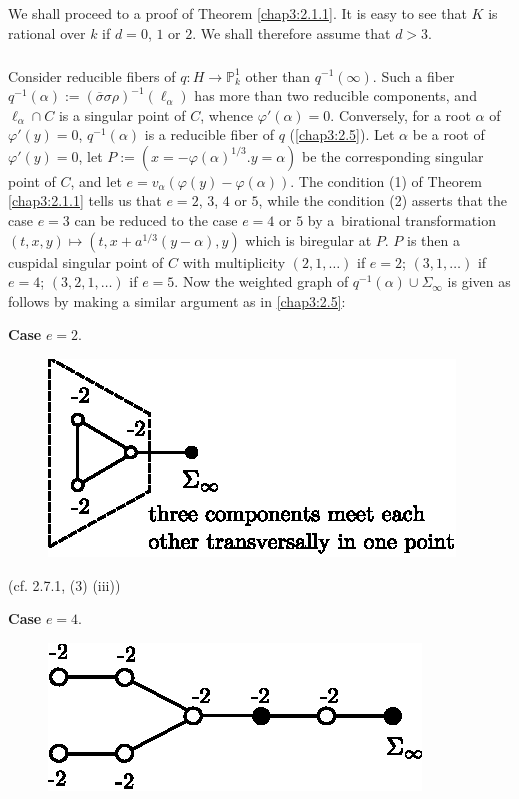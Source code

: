 \subsection{}\label{chap3:2.8}
We shall proceed to a proof of Theorem \ref{chap3:2.1.1}. It is easy to
see that $K$ is rational over $k$ if $d=0$, $1$ or $2$. We shall
therefore assume that $d>3$.

\subsubsection{}\label{chap3:2.8.1}
Consider reducible fibers of $q:H\to \mathbb{P}^{1}_{k}$ other than
$q^{-1}(\infty)$. Such a fiber
$q^{-1}(\alpha):=(\overline{\sigma}\sigma\rho)^{-1}(\ell_{\alpha})$
has more than two reducible components, and $\ell_{\alpha}\cap C$ is a
singular point of $C$, whence $\varphi'(\alpha)=0$. Conversely, for a
root $\alpha$ of $\varphi'(y)=0$, $q^{-1}(\alpha)$ is a reducible
fiber of $q$ (\cf \ref{chap3:2.5}). Let $\alpha$ be a root of
$\varphi'(y)=0$, let $P:=(x=-\varphi(\alpha)^{1/3}.y=\alpha)$ be the
corresponding singular point of $C$, and let
$e=v_{\alpha}(\varphi(y)-\varphi(\alpha))$. The condition (1) of
Theorem \ref{chap3:2.1.1} tells us that $e=2$, $3$, $4$ or $5$, while the
condition (2) asserts that the case $e=3$ can be reduced to the case
$e=4$ or $5$ by a\pageoriginale\ birational transformation
$(t,x,y)\mapsto (t,x+a^{1/3}(y-\alpha),y)$ which is biregular at
$P$. $P$ is then a cuspidal singular point of $C$ with multiplicity
$(2,1,\ldots)$ if $e=2$; $(3,1,\ldots)$ if $e=4$; $(3,2,1,\ldots)$ if
$e=5$. Now the weighted graph of $q^{-1}(\alpha)\cup \Sigma_{\infty}$
is given as follows by making a similar argument as in \ref{chap3:2.5}:

\medskip
\noindent
{\bf Case} $e=2$.
\begin{figure}[H]
\centering
\includegraphics{figures/miyansi_fig22.eps}
\end{figure}
(cf. 2.7.1, (3) (iii))

\noindent
{\bf Case} $e=4$.
\begin{figure}[H]
\centering
\includegraphics{figures/miyansi_fig23.eps}
\end{figure}


